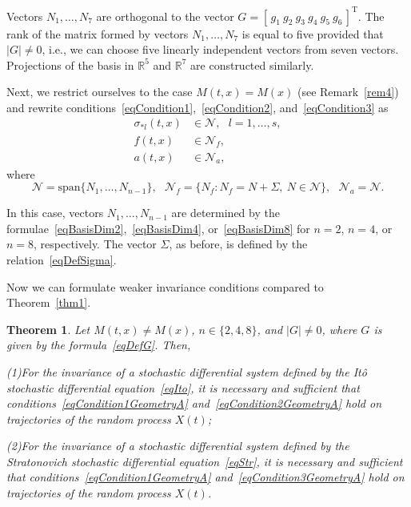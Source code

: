 \documentclass[10pt,reqno]{amsart}
\newcommand{\trans}{{\scriptscriptstyle \mathrm{T}}}
\theoremstyle{plain}
\newtheorem{Theorem}{Theorem}
\theoremstyle{remark}
\begin{document}
Vectors $N_1,\dots,N_7$ are orthogonal to the vector $G = [ \, g_1 ~ g_2 ~ g_3 ~ g_4 ~ g_5 ~ g_6 \, ]^\trans$. The rank of the matrix formed by vectors $N_1,\dots,N_7$ is equal to five provided that $|G| \neq 0$, i.e., we can choose five linearly independent vectors from seven vectors. Projections of the basis in $\mathds{R}^5$ and $\mathds{R}^7$ are constructed similarly.

Next, we restrict ourselves to the case $M(t,x) = M(x)$ (see Remark~\ref{rem4}) and rewrite conditions~\eqref{eqCondition1},~\eqref{eqCondition2}, and~\eqref{eqCondition3} as
\begin{align}
  \sigma_{*l}(t,x) & \in \mathcal{N}, \ \ \ l = 1,\dots,s, \label{eqCondition1GeometryA} \\
  f(t,x) & \in \mathcal{N}_f, \label{eqCondition2GeometryA} \\
  a(t,x) & \in \mathcal{N}_a, \label{eqCondition3GeometryA}
\end{align}
where
\[
  \mathcal{N} = \mathrm{span} \{ N_1,\dots,N_{n-1} \}, \ \ \ \mathcal{N}_f = \{ N_f \colon N_f = N + \Sigma, ~ N \in \mathcal{N} \}, \ \ \ \mathcal{N}_a = \mathcal{N}.
\]

In this case, vectors $N_1,\dots,N_{n-1}$ are determined by the formulae~\eqref{eqBasisDim2},~\eqref{eqBasisDim4}, or~\eqref{eqBasisDim8} for $n = 2$, $n = 4$, or $n = 8$, respectively. The vector $\Sigma$, as before, is defined by the relation~\eqref{eqDefSigma}.

Now we can formulate weaker invariance conditions compared to Theorem~\ref{thm1}.

\begin{Theorem}\label{thm2}
Let $M(t,x) \neq M(x)$, $n \in \{2,4,8\}$, and $|G| \neq 0$, where $G$ is given by the formula~\eqref{eqDefG}. Then,

{\rm (1)}\;For the invariance of a stochastic differential system defined by the It\^o stochastic differential equation~\eqref{eqIto}, it is necessary and sufficient that conditions~\eqref{eqCondition1GeometryA} and~\eqref{eqCondition2GeometryA} hold on trajectories of the random process $X(t)$;

{\rm (2)}\;For the invariance of a stochastic differential system defined by the Stratonovich stochastic differential equation~\eqref{eqStr}, it is necessary and sufficient that conditions~\eqref{eqCondition1GeometryA} and~\eqref{eqCondition3GeometryA} hold on trajectories of the random process $X(t)$.
\end{Theorem}
\end{document}
